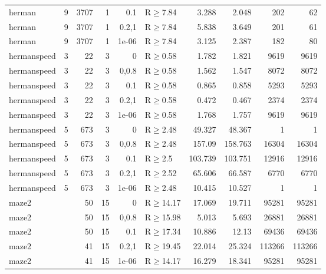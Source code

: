 \begin{longtable}{llrrrlrrrr}
 herman        & 9        &   	3707 &   1 & 0.1   & R$\geq$7.84  & 3.288   & 2.048    & 202    & 62     \\
 herman        & 9        &   	3707 &   1 & 0.2,1 & R$\geq$7.84  & 5.838   & 3.649    & 201    & 61     \\
 herman        & 9        &   	3707 &   1 & 1e-06 & R$\geq$7.84  & 3.125   & 2.387    & 182    & 80     \\
 hermanspeed   & 3        &     	22 &   3 & 0     & R$\geq$0.58  & 1.782   & 1.821    & 9619   & 9619   \\
 hermanspeed   & 3        &     	22 &   3 & 0,0.8 & R$\geq$0.58  & 1.562   & 1.547    & 8072   & 8072   \\
 hermanspeed   & 3        &     	22 &   3 & 0.1   & R$\geq$0.58  & 0.865   & 0.858    & 5293   & 5293   \\
 hermanspeed   & 3        &     	22 &   3 & 0.2,1 & R$\geq$0.58  & 0.472   & 0.467    & 2374   & 2374   \\
 hermanspeed   & 3        &     	22 &   3 & 1e-06 & R$\geq$0.58  & 1.768   & 1.757    & 9619   & 9619   \\
 hermanspeed   & 5        &    	673 &   3 & 0     & R$\geq$2.48  & 49.327  & 48.367   & 1      & 1      \\
 hermanspeed   & 5        &    	673 &   3 & 0,0.8 & R$\geq$2.48  & 157.09  & 158.763  & 16304  & 16304  \\
 hermanspeed   & 5        &    	673 &   3 & 0.1   & R$\geq$2.5   & 103.739 & 103.751  & 12916  & 12916  \\
 hermanspeed   & 5        &    	673 &   3 & 0.2,1 & R$\geq$2.52  & 65.606  & 66.587   & 6770   & 6770   \\
 hermanspeed   & 5        &    	673 &   3 & 1e-06 & R$\geq$2.48  & 10.415  & 10.527   & 1      & 1      \\
 maze2         &          &     	50 &  15 & 0     & R$\geq$14.17 & 17.069  & 19.711   & 95281  & 95281  \\
 maze2         &          &     	50 &  15 & 0,0.8 & R$\geq$15.98 & 5.013   & 5.693    & 26881  & 26881  \\
 maze2         &          &     	50 &  15 & 0.1   & R$\geq$17.34 & 10.886  & 12.13    & 69436  & 69436  \\
 maze2         &          &     	41 &  15 & 0.2,1 & R$\geq$19.45 & 22.014  & 25.324   & 113266 & 113266 \\
 maze2         &          &     	41 &  15 & 1e-06 & R$\geq$14.17 & 16.279  & 18.341   & 95281  & 95281  \\

\end{longtable}
